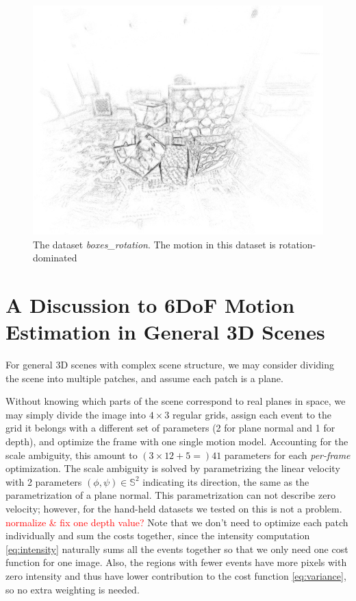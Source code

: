\begin{figure}
  \centering
  \includegraphics[width=\textwidth]{images/boxes_rotation_map.jpg}
  \caption{The dataset \textit{boxes\_rotation}. The motion in this
    dataset is rotation-dominated}
  \label{fig:boxes_rotation_map}
\end{figure}




\chapter{A Discussion to 6DoF Motion Estimation in General 3D Scenes}
\label{chap:general_scene}

For general 3D scenes with complex scene structure, we may consider
dividing the scene into multiple patches, and assume each patch is a
plane.

Without knowing which parts of the scene correspond to real planes in
space, we may simply divide the image into $4\times3$ regular grids,
assign each event to the grid it belongs with a different set of
parameters (2 for plane normal and 1 for depth), and optimize the
frame with one single motion model. Accounting for the scale
ambiguity, this amount to $(3\times12+5=)41$ parameters for each
\textit{per-frame} optimization. The scale ambiguity is solved by
parametrizing the linear velocity with 2 parameters
$(\phi,\psi)\in\mathbb{S}^2$ indicating its direction, the same as the
parametrization of a plane normal. This parametrization can not
describe zero velocity; however, for the hand-held datasets we tested
on this is not a problem. \textcolor{red}{normalize \& fix one depth
  value?} Note that we don't need to optimize each patch individually
and sum the costs together, since the intensity computation
\cref{eq:intensity} naturally sums all the events together so that we
only need one cost function for one image. Also, the regions with
fewer events have more pixels with zero intensity and thus have lower
contribution to the cost function \cref{eq:variance}, so no extra
weighting is needed.

